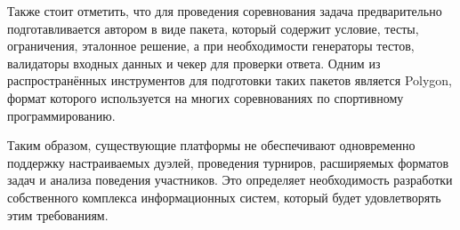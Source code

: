 Также стоит отметить, что для проведения соревнования задача предварительно подготавливается автором в виде пакета,
который содержит условие, тесты, ограничения, эталонное решение, а при необходимости генераторы тестов,
валидаторы входных данных и чекер для проверки ответа.
Одним из распространённых инструментов для подготовки таких пакетов является Polygon,
формат которого используется на многих соревнованиях по спортивному программированию.

Таким образом, существующие платформы не обеспечивают одновременно поддержку настраиваемых дуэлей, проведения турниров,
расширяемых форматов задач и анализа поведения участников.
Это определяет необходимость разработки собственного комплекса информационных систем, который будет удовлетворять этим требованиям.
